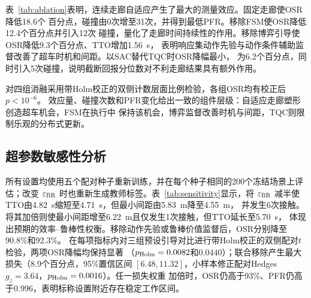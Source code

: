 \documentclass[final,5p,twocolumn]{elsarticle}
\begin{document}
表~\ref{tab:ablation}表明，连续走廊自适应产生了最大的测量效应。固定走廊使OSR降低18.6个
百分点，碰撞由0次增至31次，并得到最低PFR。移除FSM使OSR降低12.4个百分点并引入12次
碰撞，量化了走廊时间持续性的作用。移除博弈引导使OSR降低9.3个百分点、TTO增加1.56~s，
表明响应集动作先验与动作条件辅助监督改善了超车时机和间距。以SAC替代TQC时OSR降幅最小，
为6.2个百分点，同时引入5次碰撞，说明截断回报分位数对不利走廊结果具有额外作用。

对四组消融采用带Holm校正的双侧计数层面比例检验，各组OSR均有校正后$p<10^{-6}$。
效应量、碰撞次数和PFR变化给出一致的组件层级：自适应走廊塑形创造超车机会，FSM在执行中
保持该机会，博弈监督改善时机与间距，TQC则限制乐观的分布式更新。

\subsection{超参数敏感性分析}
\label{subsec:sensitivity}

所有设置均使用五个配对种子重新训练，并在每个种子相同的200个冻结场景上评估；改变
$\varepsilon_{\rm BR}$ 时也重新生成教师标签。表~\ref{tab:sensitivity}显示，将
$\varepsilon_{\rm BR}$ 减半使TTO由4.82~s缩短至4.71~s，但最小间距由5.83~m降至4.55~m，
并发生6次接触。将其加倍则使最小间距增至6.22~m且仅发生1次接触，但TTO延长至5.70~s，
体现出预期的效率--鲁棒性权衡。移除动作先验或鲁棒价值监督后，OSR分别降至90.8\%和92.3\%。
在每项指标内对三组预设引导对比进行带Holm校正的双侧配对$t$检验，两项OSR降幅均保持显著
（$p_{\rm Holm}=0.0082$和$0.0440$）；联合移除产生最大损失（8.9个百分点，95\%置信区间
$[6.48,11.32]$，小样本修正配对Hedges $g_z=3.64$，$p_{\rm Holm}=0.0016$）。任一损失权重
加倍时，OSR仍高于93\%、PFR仍高于0.996，表明标称设置附近存在稳定工作区间。
\end{document}

